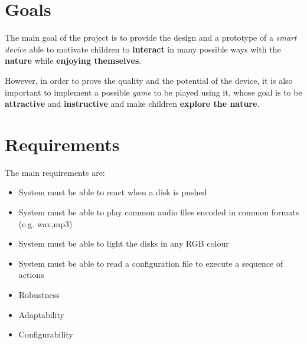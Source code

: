 \documentclass[a4paper,11pt]{report}
\begin{document}
\section{Goals}
The main goal of the project is to provide the design and a prototype of a \emph{smart device} able to motivate children to \textbf{interact} in many possible ways with the \textbf{nature} while \textbf{enjoying themselves}.\par
However, in order to prove the quality and the potential of the device, it is also important to implement a possible \emph{game} to be played using it, whose goal is to be \textbf{attractive} and \textbf{instructive} and make children \textbf{explore the nature}.
\section{Requirements}
The main requirements are:
\begin{itemize}
    \item	System must be able to react when a disk is pushed
    \item System must be able to play common audio files encoded in common formats (e.g. wav,mp3)
    \item System must be able to light the disks in any RGB colour
    \item System must be able to read a configuration file to execute a sequence of actions
    \item Robustness
    \item Adaptability
    \item Configurability

\end{itemize}
\end{document}
